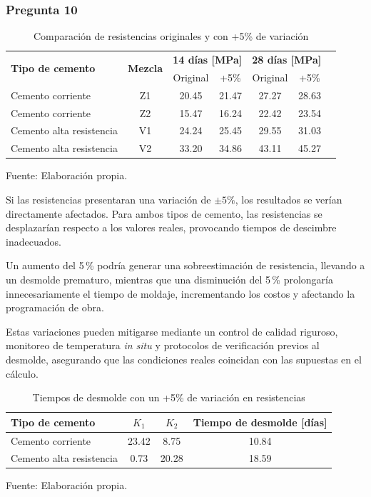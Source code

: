 \subsubsection*{Pregunta 10} 

\begin{table}[H]
\centering
\renewcommand{\arraystretch}{1.20}
\caption{Comparación de resistencias originales y con +5\% de variación}
\small
\begin{tabular}{lcccccc}
\hline
\multirow{2}{*}{\textbf{Tipo de cemento}} & \multirow{2}{*}{\textbf{Mezcla}} & \multicolumn{2}{c}{\textbf{14 días [MPa]}} & \multicolumn{2}{c}{\textbf{28 días [MPa]}} \\
\cline{3-6}
 & & Original & +5\% & Original & +5\% \\
\hline
Cemento corriente & Z1 & 20.45 & 21.47 & 27.27 & 28.63 \\
Cemento corriente & Z2 & 15.47 & 16.24 & 22.42 & 23.54 \\
\hline
Cemento alta resistencia & V1 & 24.24 & 25.45 & 29.55 & 31.03 \\
Cemento alta resistencia & V2 & 33.20 & 34.86 & 43.11 & 45.27 \\
\hline
\end{tabular}
\begin{center}
Fuente: Elaboración propia.
\end{center}
\end{table}

Si las resistencias presentaran una variación de $\pm5\%$, los resultados se verían directamente afectados.  
Para ambos tipos de cemento, las resistencias se desplazarían respecto a los valores reales, provocando tiempos de descimbre inadecuados.  

Un aumento del 5\,\% podría generar una sobreestimación de resistencia, llevando a un desmolde prematuro, mientras que una disminución del 5\,\% prolongaría innecesariamente el tiempo de moldaje, incrementando los costos y afectando la programación de obra.

Estas variaciones pueden mitigarse mediante un control de calidad riguroso, monitoreo de temperatura \textit{in situ} y protocolos de verificación previos al desmolde, asegurando que las condiciones reales coincidan con las supuestas en el cálculo.

\begin{table}[H]
\centering
\renewcommand{\arraystretch}{1.20}
\caption{Tiempos de desmolde con un +5\% de variación en resistencias}
\small
\begin{tabular}{lccc}
\hline
\textbf{Tipo de cemento} & \textbf{$K_1$} & \textbf{$K_2$} & \textbf{Tiempo de desmolde [días]} \\ 
\hline
Cemento corriente & 23.42 & 8.75 & 10.84 \\ 
Cemento alta resistencia & 0.73 & 20.28 & 18.59 \\ 
\hline
\end{tabular}
\begin{center}
Fuente: Elaboración propia.
\end{center}
\end{table}

